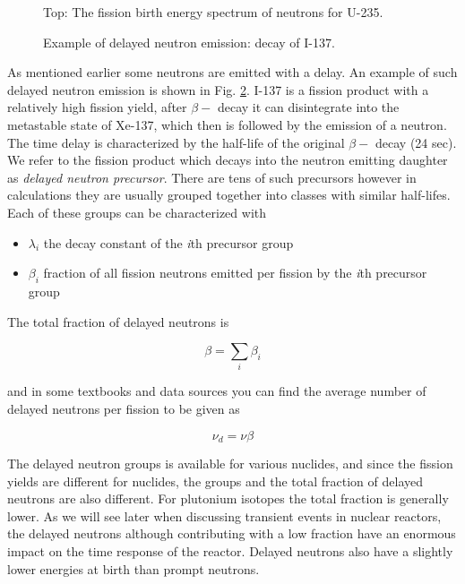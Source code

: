 \begin{figure}[ht!]
\protect {}\protect
\caption{\label{fig:watt} \footnotesize{Top: The fission birth energy spectrum of neutrons for U-235.}}
\end{figure}

\begin{figure}[ht!]
\protect {}\protect
\caption{\label{fig:delayedexample} \footnotesize{Example of delayed neutron emission: decay of I-137.}}
\end{figure}

As mentioned earlier some neutrons are emitted with a delay. An example of such delayed neutron emission is shown in Fig. \ref{fig:delayedexample}. I-137 is a fission product with a relatively high fission yield, after $\beta -$ decay it can disintegrate into the metastable state of Xe-137, which then is followed by the emission of a neutron. The time delay is characterized by the half-life of the original $\beta -$ decay (24 sec). We refer to the fission product which decays into the neutron emitting daughter as \textit{delayed neutron precursor}. There are tens of such precursors however in calculations they are usually grouped together into classes with similar half-lifes. Each of these groups can be characterized with

\begin{itemize}
\item $\lambda_i$ the decay constant of the \textit{i}th precursor group
\item $\beta_i$ fraction of all fission neutrons emitted per fission by the \textit{i}th precursor group
\end{itemize} 

The total fraction of delayed neutrons is

\[
\beta=\sum_i \beta_i
\]

and in some textbooks and data sources you can find the average number of delayed neutrons per fission to be given as

\[
\nu_d=\nu\beta
\]


The delayed neutron groups is available for various nuclides, and since the fission yields are different for nuclides, the groups and the total fraction of delayed neutrons are also different. For plutonium isotopes the total fraction is generally lower. As we will see later when discussing transient events in nuclear reactors, the delayed neutrons although contributing with a low fraction have an enormous impact on the time response of the reactor. Delayed neutrons also have a slightly lower energies at birth than prompt neutrons. 


